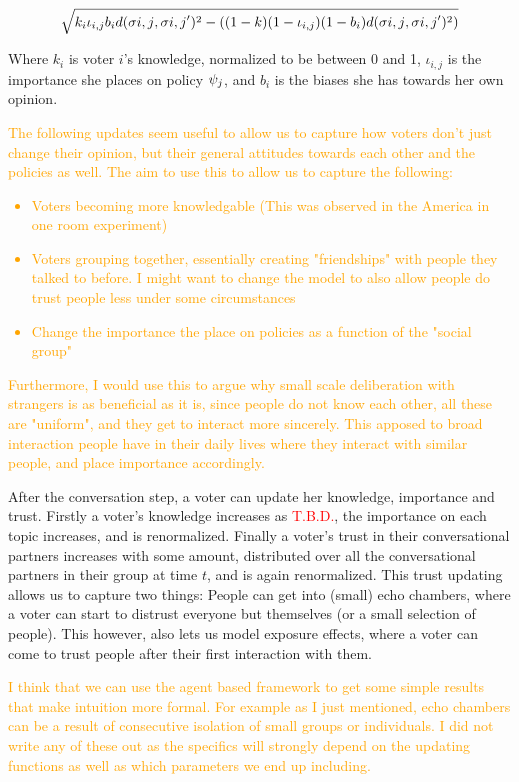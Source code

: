 \begin{equation}
	\label{eq:abm_update_function}
	\sqrt{k_{i}\iota_{i,j} b_{i}d(\sigma{i,j}, \sigma{i,j}')^{2} - ((1-k)(1-\iota_{i,j})(1-b_{i})d(\sigma{i,j}, \sigma{i,j}')^{2})}
\end{equation}

Where $k_{i}$ is voter $i$'s knowledge, normalized to be between 0 and 1, $\iota_{i,j}$ is the importance she places on policy $\psi_{j}$, and $b_{i}$ is the biases she has towards her own opinion.

\textcolor{orange}{The following updates seem useful to allow us to capture how voters don't just change their opinion, but their general attitudes towards each other and the policies as well. The aim to use this to allow us to capture the following:}
\textcolor{orange}{
	\begin{itemize}
		\item Voters becoming more knowledgable (This was observed in the America in one room experiment)
		\item Voters grouping together, essentially creating "friendships" with people they talked to before. I might want to change the model to also allow people do trust people less under some circumstances
		\item Change the importance the place on policies as a function of the "social group"
	\end{itemize}}

\textcolor{orange}{
	Furthermore, I would use this to argue why small scale deliberation with strangers is as beneficial as it is, since people do not know each other, all these are "uniform", and they get to interact more sincerely. This apposed to broad interaction people have in their daily lives where they interact with similar people, and place importance accordingly.
}

After the conversation step, a voter can update her knowledge, importance and trust. Firstly a voter's knowledge increases as \textcolor{red}{T.B.D.}, the importance on each topic increases, and is renormalized. Finally a voter's trust in their conversational partners increases with some amount, distributed over all the conversational partners in their group at time $t$, and is again renormalized. This trust updating allows us to capture two things: People can get into (small) echo chambers, where a voter can start to distrust everyone but themselves (or a small selection of people). This however, also lets us model exposure effects, where a voter can come to trust people after their first interaction with them.

\textcolor{orange}{
	I think that we can use the agent based framework to get some simple results that make intuition more formal. For example as I just mentioned, echo chambers can be a result of consecutive isolation of small groups or individuals. I did not write any of these out as the specifics will strongly depend on the updating functions as well as which parameters we end up including.
}

